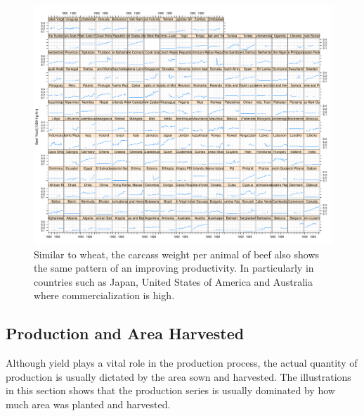 \documentclass[nojss]{jss}\usepackage[]{graphicx}\usepackage[]{color}
\makeatletter
\def\maxwidth{ %
  \ifdim\Gin@nat@width>\linewidth
    \linewidth
  \else
    \Gin@nat@width
  \fi
}
\newenvironment{knitrout}{}{} %
\makeatother
\begin{document}
\begin{knitrout}
\color{fgcolor}\begin{figure}[!ht]


{\centering \includegraphics[width=\maxwidth]{figure/beef-yield-explore} 

}

\caption[Similar to wheat, the carcass weight per animal of beef also shows the same pattern of an improving productivity]{Similar to wheat, the carcass weight per animal of beef also shows the same pattern of an improving productivity. In particularly in countries such as Japan, United States of America and Australia where commercialization is high.\label{fig:beef-yield-explore}}
\end{figure}


\end{knitrout}




\FloatBarrier
\subsection{Production and Area Harvested}

Although yield plays a vital role in the production process, the
actual quantity of production is usually dictated by the area sown and
harvested. The illustrations in this section shows that the production
series is usually dominated by how much area was planted and
harvested.\\
\end{document}
